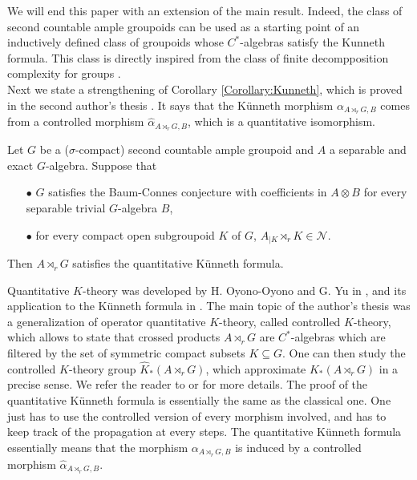 We will end this paper with an extension of the main result. Indeed, the class of second countable ample groupoids can be used as a starting point of an inductively defined class of groupoids whose $C^*$-algebras satisfy the Kunneth formula. This class is directly inspired from the class of finite decompposition complexity for groups \cite{GTY}. \\


Next we state a strengthening of Corollary \ref{Corollary:Kunneth}, which is proved in the second author's thesis \cite{DellAieraThesis}. It says that the Künneth morphism $\alpha_{A\rtimes_r G,B}$ comes from a controlled morphism $\hat \alpha_{A\rtimes_r G,B}$, which is a quantitative isomorphism.

\begin{thm}
Let $G$ be a ($\sigma$-compact) second countable ample groupoid and $A$ a separable and exact $G$-algebra. Suppose that 
\begin{itemize}
\item[$\bullet$] $G$ satisfies the Baum-Connes conjecture with coefficients in $A\otimes B $ for every separable trivial $G$-algebra $B$,
\item[$\bullet$] for every compact open subgroupoid $K$ of $G$, $A_{|K}\rtimes_r K \in \mathcal N$.
\end{itemize} 
Then $A\rtimes_r G$ satisfies the quantitative Künneth formula.
\end{thm}

Quantitative $K$-theory was developed by H. Oyono-Oyono and G. Yu in \cite{OY2}, and its application to the Künneth formula in \cite{OY4}. The main topic of the author's thesis \cite{DellAieraThesis} was a generalization of operator quantitative $K$-theory, called controlled $K$-theory, which allows to state that crossed products $A\rtimes_r G$ are $C^*$-algebras which are filtered by the set of symmetric compact subsets $K\subseteq G$. One can then study the controlled $K$-theory group $\hat K_*(A\rtimes_r G)$, which approximate $K_*(A\rtimes_r G)$ in a precise sense. We refer the reader to \cite{DellAieraThesis} or \cite{dell2017controlled} for more details. The proof of the quantitative Künneth formula is essentially the same as the classical one. One just has to use the controlled version of every morphism involved, and has to keep track of the propagation at every steps. The quantitative Künneth formula essentially means that the morphism $\alpha_{A\rtimes_r G, B}$ is induced by a controlled morphism $\hat\alpha_{A\rtimes_r G , B}$.\\

